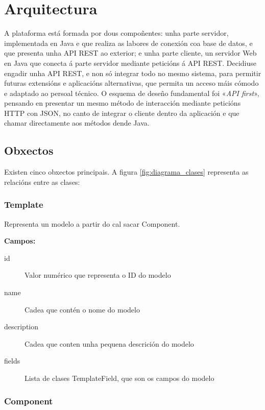 \chapter{Arquitectura}
\label{chap:arquitectura}

A plataforma está formada por dous compoñentes: unha parte servidor, implementada en Java e que realiza as labores de conexión coa base de datos, e que presenta unha \acrshort{API} \acrshort{REST} ao exterior; e unha parte cliente, un servidor Web en Java que conecta á parte servidor mediante peticións á \acrshort{API} \acrshort{REST}. Decidiuse engadir unha API REST, e non só integrar todo no mesmo sistema, para permitir futuras extensións e aplicacións alternativas, que permita un acceso máis cómodo e adaptado ao persoal técnico. O esquema de deseño fundamental foi «\textit{API first}», pensando en presentar un mesmo método de interacción mediante peticións HTTP con JSON, no canto de integrar o cliente dentro da aplicación e que chamar directamente aos métodos dende Java.

\section{Obxectos}

Existen cinco obxectos principais. A figura \ref{fig:diagrama_clases} representa as relacións entre as clases:

\subsection{Template}
\label{obx:template}

Representa un modelo a partir do cal sacar \Gls{Component}.

\textbf{Campos:}

\begin{description}
    \item[id] Valor numérico que representa o ID do modelo
    \item[name] Cadea que contén o nome do modelo
    \item[description] Cadea que conten unha pequena descrición do modelo
    \item[fields] Lista de clases \Gls{TemplateField}, que son os campos do modelo
\end{description}

\subsection{Component}
\label{obx:component}

